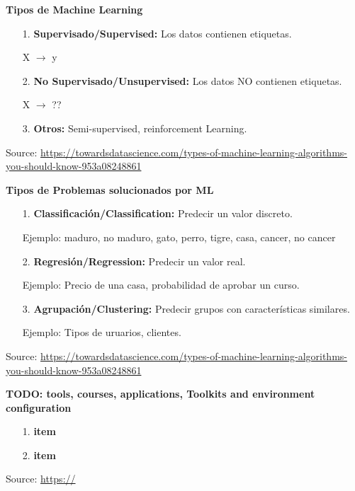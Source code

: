 \documentclass[english,svgnames,notes=hide,12pt]{beamer}
\begin{document}
\begin{frame}
    \textbf{Tipos de Machine Learning}
    \begin{itemize}
        \item[\small{1.}] \textbf{Supervisado/Supervised:} Los datos contienen etiquetas.
        
        X $\rightarrow$ y
        \item[\small{2.}] \textbf{No Supervisado/Unsupervised:} Los datos NO contienen etiquetas.
        
        X $\rightarrow$ ??
        \item[\small{3.}] \textbf{Otros:} Semi-supervised, reinforcement Learning.
    \end{itemize}

    \tiny{Source: \url{https://towardsdatascience.com/types-of-machine-learning-algorithms-you-should-know-953a08248861}}
\end{frame}


\begin{frame}
    \textbf{Tipos de Problemas solucionados por ML}
    \begin{itemize}
        \item[\small{1.}] \textbf{Classificación/Classification:} Predecir un valor discreto.

        Ejemplo: {maduro, no maduro}, {gato, perro, tigre, casa}, {cancer, no cancer}

        \item[\small{2.}] \textbf{Regresión/Regression:} Predecir un valor real.

        Ejemplo: Precio de una casa, probabilidad de aprobar un curso.

        \item[\small{3.}] \textbf{Agrupación/Clustering:} Predecir grupos con características similares.

        Ejemplo: Tipos de uruarios, clientes.
    \end{itemize}

    \tiny{Source: \url{https://towardsdatascience.com/types-of-machine-learning-algorithms-you-should-know-953a08248861}}
\end{frame}

\begin{frame}
    \textbf{TODO: tools, courses, applications, Toolkits and environment configuration}
    \begin{itemize}
        \item[\small{1.}] \textbf{item} 
        \item[\small{2.}] \textbf{item}
    \end{itemize}

    \tiny{Source: \url{https://}}
\end{frame}
\end{document}
